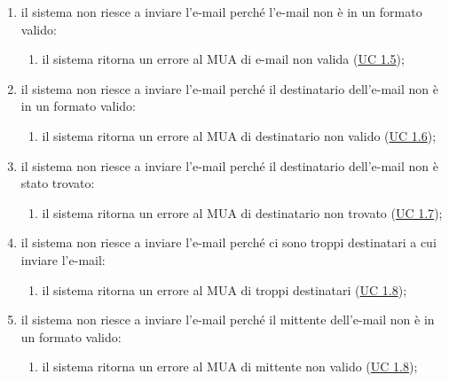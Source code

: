 \begin{itemize}
        \begin{enumerate}[label=\alph*.]
            \item il sistema non riesce a inviare l'e-mail perché l'e-mail non è in un formato valido:
            \begin{enumerate}[label=\arabic*.]
                \item il sistema ritorna un errore al MUA di e-mail non valida (\hyperref[sec:UC1.5]{UC 1.5});
            \end{enumerate}
            \item il sistema non riesce a inviare l'e-mail perché il destinatario dell'e-mail non è in un formato valido:
            \begin{enumerate}[label=\arabic*.]
                \item il sistema ritorna un errore al MUA di destinatario non valido (\hyperref[sec:UC1.6]{UC 1.6});
            \end{enumerate}
            \item il sistema non riesce a inviare l'e-mail perché il destinatario dell'e-mail non è stato trovato:
            \begin{enumerate}[label=\arabic*.]
                \item il sistema ritorna un errore al MUA di destinatario non trovato (\hyperref[sec:UC1.7]{UC 1.7});
            \end{enumerate}
            \item il sistema non riesce a inviare l'e-mail perché ci sono troppi destinatari a cui inviare l'e-mail:
            \begin{enumerate}[label=\arabic*.]
                \item il sistema ritorna un errore al MUA di troppi destinatari (\hyperref[sec:UC1.8]{UC 1.8});
            \end{enumerate}
            \item il sistema non riesce a inviare l'e-mail perché il mittente dell'e-mail non è in un formato valido:
            \begin{enumerate}[label=\arabic*.]
                \item il sistema ritorna un errore al MUA di mittente non valido (\hyperref[sec:UC1.8]{UC 1.8});
            \end{enumerate}
        \end{enumerate}
    \end{itemize}


